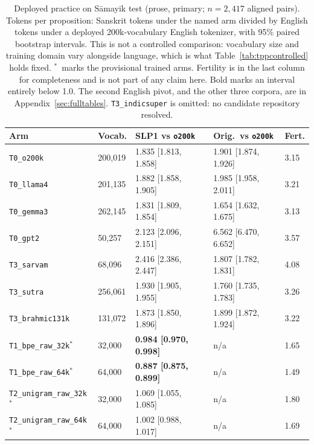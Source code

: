 \begin{table}[t]
\centering
\footnotesize
\begin{tabular}{lllll}
\toprule
Arm & Vocab. & SLP1 vs \texttt{o200k} & Orig.\ vs \texttt{o200k} & Fert. \\
\midrule
\texttt{T0\_o200k} & 200,019 & 1.835 [1.813, 1.858] & 1.901 [1.874, 1.926] & 3.15 \\
\texttt{T0\_llama4} & 201,135 & 1.882 [1.858, 1.905] & 1.985 [1.958, 2.011] & 3.21 \\
\texttt{T0\_gemma3} & 262,145 & 1.831 [1.809, 1.854] & 1.654 [1.632, 1.675] & 3.13 \\
\texttt{T0\_gpt2} & 50,257 & 2.123 [2.096, 2.151] & 6.562 [6.470, 6.652] & 3.57 \\
\texttt{T3\_sarvam} & 68,096 & 2.416 [2.386, 2.447] & 1.807 [1.782, 1.831] & 4.08 \\
\texttt{T3\_sutra} & 256,061 & 1.930 [1.905, 1.955] & 1.760 [1.735, 1.783] & 3.26 \\
\texttt{T3\_brahmic131k} & 131,072 & 1.873 [1.850, 1.896] & 1.899 [1.872, 1.924] & 3.22 \\
\texttt{T1\_bpe\_raw\_32k}$^{*}$ & 32,000 & \textbf{0.984 [0.970, 0.998]} & n/a & 1.65 \\
\texttt{T1\_bpe\_raw\_64k}$^{*}$ & 64,000 & \textbf{0.887 [0.875, 0.899]} & n/a & 1.49 \\
\texttt{T2\_unigram\_raw\_32k}$^{*}$ & 32,000 & 1.069 [1.055, 1.085] & n/a & 1.80 \\
\texttt{T2\_unigram\_raw\_64k}$^{*}$ & 64,000 & 1.002 [0.988, 1.017] & n/a & 1.69 \\
\bottomrule
\end{tabular}
\caption{Deployed practice on S\=amayik test (prose, primary; $n=2{,}417$ aligned pairs). Tokens per proposition: Sanskrit tokens under the named arm divided by English tokens under a deployed 200k-vocabulary English tokenizer, with 95\% paired bootstrap intervals. This is not a controlled comparison: vocabulary size and training domain vary alongside language, which is what Table~\ref{tab:tppcontrolled} holds fixed. $^{*}$~marks the provisional trained arms. Fertility is in the last column for completeness and is not part of any claim here. Bold marks an interval entirely below 1.0. The second English pivot, and the other three corpora, are in Appendix~\ref{sec:fulltables}. \texttt{T3\_indicsuper} is omitted: no candidate repository resolved.}
\label{tab:tppdeployed}
\end{table}

